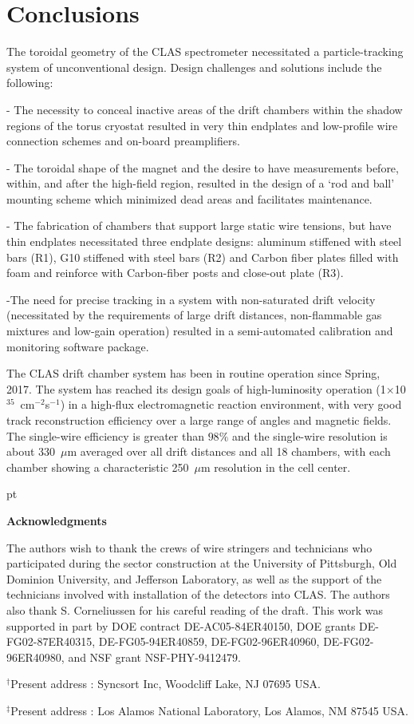 \section{Conclusions}

\hskip 0.15in
The toroidal geometry of the CLAS spectrometer necessitated a particle-tracking 
system of unconventional design.  Design challenges and solutions include the following:

\vskip 10pt
\noindent
- The necessity to conceal inactive areas of the drift chambers within the
shadow regions of the torus cryostat resulted in very thin endplates and low-profile
wire connection schemes and on-board preamplifiers.

\noindent
- The toroidal shape of the magnet and the desire to have measurements before, within, 
and after the high-field region, resulted in the design of a `rod and ball' mounting scheme
which minimized dead areas and facilitates maintenance.

\noindent
- The fabrication of chambers that support large static wire tensions, but have thin 
endplates necessitated three endplate designs: aluminum stiffened with steel bars (R1),
G10 stiffened with steel bars (R2) and Carbon fiber plates filled with foam and reinforce
with Carbon-fiber posts and close-out plate (R3). 

\noindent
-The need for precise tracking in a system with non-saturated drift velocity 
(necessitated by the requirements of large drift distances, non-flammable gas mixtures 
and low-gain operation) resulted in a semi-automated calibration and monitoring software 
package.

\vskip 10pt
The CLAS drift chamber system has been in routine operation since Spring, 2017. 
The system has reached its design goals of 
high-luminosity operation (1$\times$10$^{35}$~cm$^{-2}$s$^{-1}$) in a 
high-flux electromagnetic reaction environment, with very good track 
reconstruction efficiency over a large range of angles and 
magnetic fields.  The single-wire efficiency is greater than $98\%$ and the
single-wire resolution is about 330~$\mu$m averaged over all drift distances and
all 18 chambers, with each chamber showing a characteristic 250~$\mu$m resolution 
in the cell center.

 pt

{\large{\bf Acknowledgments}}

\vskip 10pt

The authors wish to thank the crews of wire stringers and technicians who 
participated during the sector construction at the University of Pittsburgh,
Old Dominion University, and Jefferson Laboratory, as well as the support of 
the technicians involved with installation of the detectors into CLAS.  The
authors also thank S. Corneliussen for his careful reading of the draft.  This
work was supported in part by DOE contract DE-AC05-84ER40150, DOE grants 
DE-FG02-87ER40315, DE-FG05-94ER40859, DE-FG02-96ER40960, DE-FG02-96ER40980, 
and NSF grant NSF-PHY-9412479.

\vskip 10pt

\noindent
$^{\dagger}$Present address : Syncsort Inc, Woodcliff Lake, NJ 07695 USA.

\noindent
$^{\ddagger}$Present address : Los Alamos National Laboratory, Los Alamos, NM
87545 USA.


